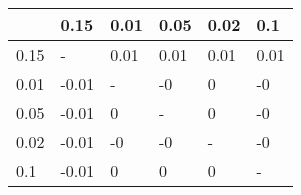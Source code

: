 \begin{tabular}{llllll}
\toprule
{} &  0.15 &  0.01 &  0.05 &  0.02 &   0.1 \\
\midrule
0.15 &     - &  0.01 &  0.01 &  0.01 &  0.01 \\
0.01 & -0.01 &     - &    -0 &     0 &    -0 \\
0.05 & -0.01 &     0 &     - &     0 &    -0 \\
0.02 & -0.01 &    -0 &    -0 &     - &    -0 \\
0.1  & -0.01 &     0 &     0 &     0 &     - \\
\bottomrule
\end{tabular}
